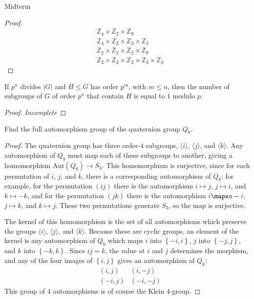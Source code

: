 \documentclass[12pt]{article}
\newcommand{\Z}{\mathbb{Z}}
\theoremstyle{definition}
\newenvironment{problem}[2][Problem]{\begin{trivlist}
\item[\hskip \labelsep {\bfseries #1}\hskip \labelsep {\bfseries #2.}]}{\end{trivlist}}
\begin{document}
\begin{section}{Midterm}
\begin{problem}{4}
\begin{proof}
\begin{align*}
		&\Z_4 \times \Z_2 \times \Z_9 \\&\Z_4 \times \Z_2 \times \Z_3 \times \Z_3\\
		&\Z_2 \times \Z_2 \times \Z_2 \times \Z_9 \\&\Z_2 \times \Z_2 \times \Z_2 \times \Z_3 \times \Z_3
		\end{align*}
	\end{proof}
\end{problem}
\begin{problem}{5}
	If $p^n$ divides $\left \lvert { G } \right \lvert $ and $H \leq G$ has order $p^m$, with $m \leq n$, then the number of subgroups of $G$ of order $p^n$ that contain $H$ is equal to $1$ modulo $p$.
	\begin{proof}
		\textit{Incomplete}
	\end{proof}
\end{problem} 
\begin{problem}{6}
	Find the full automorphism group of the quaternion group $Q_8$.	
	\begin{proof}
		The quaternion group has three order-$4$ subgroups, $\langle i\rangle$, $\langle j\rangle$, and $\langle k\rangle$. Any automorphism of $Q_8$ must map each of these subgroups to another, giving a homomorphism $\text{Aut}(Q_8) \to S_3$. This homomorphism is surjective, since for each permutation of $i$, $j$, and $k$, there is a corresponding automorphism of $Q_8$: for example, for the permutation $(ij)$ there is the automorphism $i \mapsto j$, $j \mapsto i$, and $k \mapsto -k$, and for the permutation $(jk)$ there is the automorphism $i \mapso -i$, $j \mapsto k$, and $k \mapsto j$. These two permutations generate $S_3$, so the map is surjective.
	\par The kernel of this homomorphism is the set of all automorphisms which preserve the groups $\langle i\rangle$, $\langle j\rangle$, and $\langle k\rangle$. Because these are cyclic groups, an element of the kernel is any automorphism of $Q_8$ which maps $i$ into $\left\{ -i, i \right\}$, $j$ into $\left\{ -j, j \right\}$, and $k$ into $\left\{ -k, k \right\}$. Since $ij=k$, the value at  $i$ and $j$ determines the morphism, and any of the four images of $\left\{ i, j \right\}$ gives an automorphism of $Q_8$:
	\begin{align*}
		&(i, j) & (i, -j)\\
		&(-i, j) & (-i, -j)
	\end{align*}
	This group of $4$ automorphisms is of course the Klein $4$-group. 
	\end{proof}

\end{problem}
\end{section}
\end{document}
